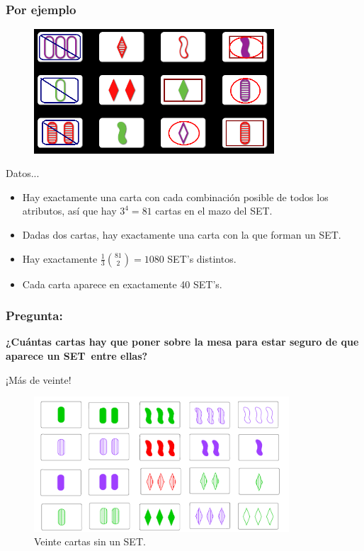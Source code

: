 \documentclass[smaller,usepdftitle=false]{beamer}
\newcommand\SET{\textsf{SET}}
\begin{document}
\begin{frame}
\frametitle{Por ejemplo}
\begin{figure}[h!]
\centering
\includegraphics[width=0.8\textwidth]{cards3}
\end{figure}
\end{frame}
\begin{frame}{Datos...}
\begin{itemize}
\item Hay exactamente una carta con cada combinación posible de todos los atributos, así
que hay $3^4 = 81$ cartas en el mazo del \SET.

\item Dadas dos cartas, hay exactamente una carta con la que forman un \SET.

\item Hay exactamente $\frac{1}{3}\binom{81}{2} = 1080$ \SET's distintos.

\item Cada carta aparece en exactamente 40 \SET's.
\end{itemize}
\end{frame}

\begin{frame}
\frametitle{Pregunta:}
\noindent \textbf{¿Cuántas cartas hay que poner sobre la mesa para estar
seguro de que aparece un \SET~entre ellas?} 

\pause

¡Más de veinte!

\begin{figure}[h!]
\centering
\includegraphics[width=0.85\textwidth]{caps}
\caption{Veinte cartas sin un \SET.}
\end{figure}
\end{frame}
\end{document}
